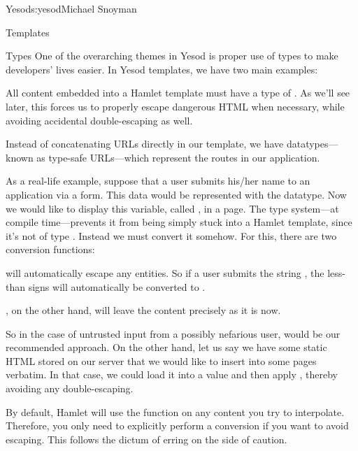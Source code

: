 \begin{aosachapter}{Yesod}{s:yesod}{Michael Snoyman}
\begin{aosasect1}{Templates}
\begin{aosasect2}{Types}
One of the overarching themes in Yesod is proper use of types to make
developers' lives easier. In Yesod templates, we have two main
examples:

\begin{aosaenumerate}

\item All content embedded into a Hamlet template must have a type of
  . As we'll see later, this forces us to properly escape
  dangerous HTML when necessary, while avoiding accidental
  double-escaping as well.

\item Instead of concatenating URLs directly in our template, we have
  datatypes---known as type-safe URLs---which represent the routes in
  our application.

\end{aosaenumerate}

As a real-life example, suppose that a user submits his/her name to an
application via a form. This data would be represented with the 
datatype. Now we would like to display this variable, called
, in a page. The type system---at compile time---prevents
it from being simply stuck into a Hamlet template, since it's not of
type . Instead we must convert it somehow. For this, there are two
conversion functions:

\begin{aosaenumerate}

\item {} will automatically escape any entities. So if a user
  submits the string , the less-than signs will automatically be converted to \code{\&{\textless}}.

\item {}, on the other hand, will leave the content
  precisely as it is now.

\end{aosaenumerate}

So in the case of untrusted input from a possibly nefarious user,
 would be our recommended approach. On the other hand, let us
say we have some static HTML stored on our server that we would like
to insert into some pages verbatim. In that case, we could load it
into a  value and then apply , thereby
avoiding any double-escaping.

By default, Hamlet will use the  function on any
content you try to interpolate. Therefore, you only need to explicitly
perform a conversion if you want to avoid escaping. This follows the
dictum of erring on the side of caution.


\end{aosasect2}
\end{aosasect1}
\end{aosachapter}

